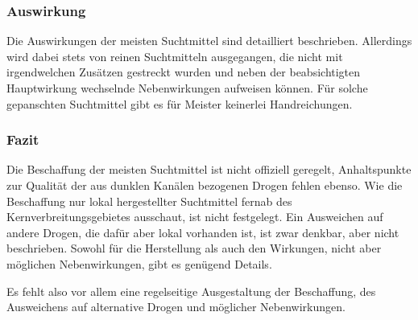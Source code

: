 \subsubsection{Auswirkung}
Die Auswirkungen der meisten Suchtmittel sind detailliert beschrieben. Allerdings wird dabei stets von reinen Suchtmitteln ausgegangen, die nicht mit irgendwelchen Zusätzen gestreckt wurden und neben der beabsichtigten Hauptwirkung wechselnde Nebenwirkungen aufweisen können. Für solche gepanschten Suchtmittel gibt es für Meister keinerlei Handreichungen.

\subsubsection{Fazit}
Die Beschaffung der meisten Suchtmittel ist nicht offiziell geregelt, Anhaltspunkte zur Qualität der aus dunklen Kanälen bezogenen Drogen fehlen ebenso. Wie die Beschaffung nur lokal hergestellter Suchtmittel fernab des Kernverbreitungsgebietes ausschaut, ist nicht festgelegt. Ein Ausweichen auf andere Drogen, die dafür aber lokal vorhanden ist, ist zwar denkbar, aber nicht beschrieben. Sowohl für die Herstellung als auch den Wirkungen, nicht aber möglichen Nebenwirkungen, gibt es genügend Details.

Es fehlt also vor allem eine regelseitige Ausgestaltung der Beschaffung, des Ausweichens auf alternative Drogen und möglicher Nebenwirkungen.

